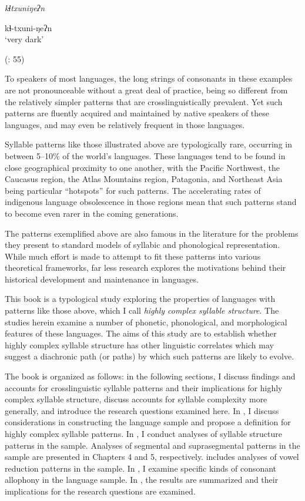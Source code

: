 \ea\label{ex:1.5}

\textit{kɬtxuniŋeʔn}

kɬ-txuni-ŋeʔn\\
\glt ‘very dark’

(\citealt{GeorgVolodin1999}: 55)
\z

To speakers of most languages, the long strings of consonants in these examples are not pronounceable without a great deal of practice, being so different from the relatively simpler patterns that are crosslinguistically prevalent. Yet such patterns are fluently acquired and maintained by native speakers of these languages, and may even be relatively frequent in those languages.

  Syllable patterns like those illustrated above are typologically rare, occurring in between 5--10\% of the world’s languages. These languages tend to be found in close geographical proximity to one another, with the Pacific Northwest, the Caucasus region, the Atlas Mountains region, Patagonia, and Northeast Asia being particular ``hotspots'' for such patterns. The accelerating rates of indigenous language obsolescence in those regions mean that such patterns stand to become even rarer in the coming generations.

  The patterns exemplified above are also famous in the literature for the problems they present to standard models of syllabic and phonological representation. While much effort is made to attempt to fit these patterns into various theoretical frameworks, far less research explores the motivations behind their historical development and maintenance in languages.

  This book is a typological study exploring the properties of languages with patterns like those above, which I call \textit{highly complex syllable structure}. The studies herein examine a number of phonetic, phonological, and morphological features of these languages. The aims of this study are to establish whether highly complex syllable structure has other linguistic correlates which may suggest a diachronic path (or paths) by which such patterns are likely to evolve.

  The book is organized as follows: in the following sections, I discuss findings and accounts for crosslinguistic syllable patterns and their implications for highly complex syllable structure, discuss accounts for syllable complexity more generally, and introduce the research questions examined here. In , I discuss considerations in constructing the language sample and propose a definition for highly complex syllable patterns. In , I conduct analyses of syllable structure patterns in the sample. Analyses of segmental and suprasegmental patterns in the sample are presented in Chapters 4 and 5, respectively.  includes analyses of vowel reduction patterns in the sample. In , I examine specific kinds of consonant allophony in the language sample. In , the results are summarized and their implications for the research questions are examined.

